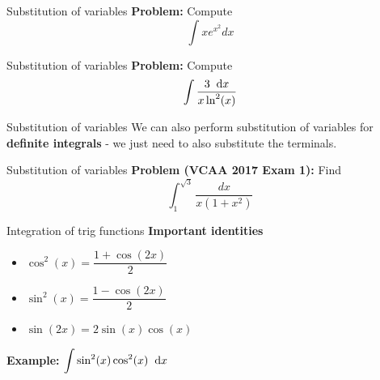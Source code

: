 \documentclass{beamer}
\renewcommand{\d}{\hspace{0.2cm}\text{d}}
\begin{document}
\begin{frame}{Substitution of variables}
	\textbf{Problem: } Compute $$\int x e^{x^2} dx$$
	\vspace{5cm}
\end{frame}

\begin{frame}{Substitution of variables}
	\textbf{Problem: } Compute $$\int \dfrac{3 \d x}{x \ln^2(x)}$$
	\vspace{5cm}
\end{frame}

\begin{frame}{Substitution of variables}
	We can also perform substitution of variables for \textbf{definite integrals} - we just need to also substitute the terminals.
\end{frame}

\begin{frame}{Substitution of variables}
	\textbf{Problem (VCAA 2017 Exam 1):} Find $$\int_1^{\sqrt{3}} \dfrac{dx}{x(1+x^2)}$$
	\vspace{5cm}
\end{frame}

\begin{frame}{Integration of trig functions}
\textbf{Important identities}
\begin{itemize}
	\item $\cos^2(x) = \dfrac{1 + \cos(2x)}{2}$
	\item $\sin^2(x) = \dfrac{1 - \cos(2x)}{2}$
	\item $\sin(2x) = 2\sin(x)\cos(x)$
\end{itemize}

\textbf{Example: } $\displaystyle\int \sin^2(x)\cos^2(x) \d x$

\end{frame}
\end{document}
